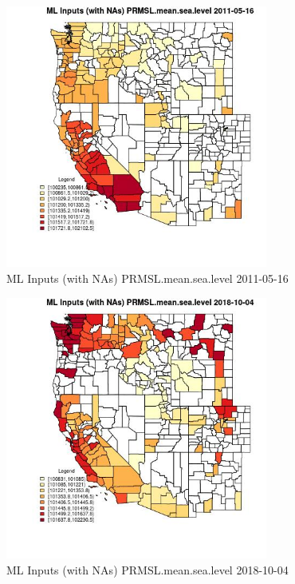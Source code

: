 \begin{figure} 
\centering  
\includegraphics[width=0.77\textwidth]{Code_Outputs/Report_ML_input_PM25_Step4_part_f_de_duplicated_aves_prioritize_24hr_obswNAs_CountyPRMSLmeansealevelMean2011-05-16.jpg} 
\caption{\label{fig:Report_ML_input_PM25_Step4_part_f_de_duplicated_aves_prioritize_24hr_obswNAsCountyPRMSLmeansealevelMean2011-05-16}ML Inputs (with NAs) PRMSL.mean.sea.level 2011-05-16} 
\end{figure} 
 

\clearpage 

\begin{figure} 
\centering  
\includegraphics[width=0.77\textwidth]{Code_Outputs/Report_ML_input_PM25_Step4_part_f_de_duplicated_aves_prioritize_24hr_obswNAs_CountyPRMSLmeansealevelMean2018-10-04.jpg} 
\caption{\label{fig:Report_ML_input_PM25_Step4_part_f_de_duplicated_aves_prioritize_24hr_obswNAsCountyPRMSLmeansealevelMean2018-10-04}ML Inputs (with NAs) PRMSL.mean.sea.level 2018-10-04} 
\end{figure} 
 


